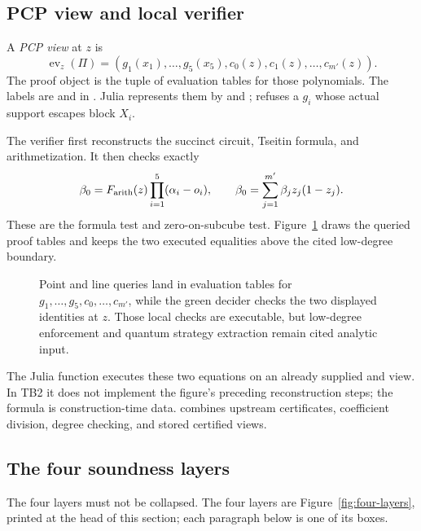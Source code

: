 \subsection{PCP view and local verifier}

A \emph{PCP view} at \(z\) is
\[
 \operatorname{ev}_z(\Pi)=
 (g_1(x_1),\ldots,g_5(x_5),c_0(z),c_1(z),\ldots,c_{m'}(z)).
\]
The proof object is the tuple of evaluation tables for those polynomials.
The labels are  and  in
.  Julia represents them by
 and ;  refuses a \(g_i\) whose actual
support escapes block \(X_i\).

The verifier first reconstructs the succinct circuit, Tseitin formula, and
arithmetization.  It then checks exactly
\[
 \beta_0=F_{\rm arith}(z)\prod_{i=1}^5(\alpha_i-o_i),
 \qquad
 \beta_0=\sum_{j=1}^{m'}\beta_j z_j(1-z_j).
\]
These are the formula test and zero-on-subcube test.
Figure~\ref{fig:pcp-local-verifier} draws the queried proof tables and keeps
the two executed equalities above the cited low-degree boundary.
\begin{figure}[t]
\centering

\caption{Point and line queries land in evaluation tables for \(g_1,\ldots,g_5,c_0,\ldots,c_{m'}\), while the green decider checks the two displayed identities at \(z\).  Those local checks are executable, but low-degree enforcement and quantum strategy extraction remain cited analytic input.}
\label{fig:pcp-local-verifier}
\end{figure}
The Julia function  executes these two equations on an
already supplied  and view.  In TB2 it does not implement
the figure's preceding reconstruction steps; the formula is construction-time
data.   combines upstream certificates, coefficient division,
degree checking, and stored certified views.

\subsection{The four soundness layers}

The four layers must not be collapsed.
The four layers are Figure~\ref{fig:four-layers}, printed at the head of this
section; each paragraph below is one of its boxes.

